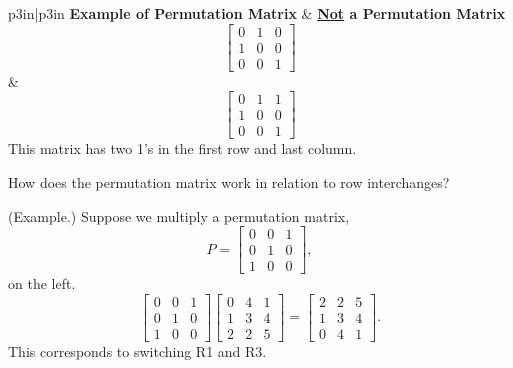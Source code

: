 \documentclass[letterpaper]{article}
\newcommand{\0}{\mathbf{0}}
\begin{document}
\begin{center}
    \begin{tabular}{p{3in}|p{3in}}
        \textbf{Example of Permutation Matrix} & \textbf{\underline{Not} a Permutation Matrix} \\ 
        \hline 
        \[\begin{bmatrix}
            0 & 1 & 0 \\ 
            1 & 0 & 0 \\ 
            0 & 0 & 1 
        \end{bmatrix}\] & \[\begin{bmatrix}
            0 & 1 & 1 \\ 
            1 & 0 & 0 \\ 
            0 & 0 & 1
        \end{bmatrix}\]
        This matrix has two 1's in the first row and last column.
    \end{tabular}
\end{center}
How does the permutation matrix work in relation to row interchanges?

\begin{mdframed}
    (Example.) Suppose we multiply a permutation matrix, 
    \[P = \begin{bmatrix}
        0 & 0 & 1 \\ 
        0 & 1 & 0 \\ 
        1 & 0 & 0
    \end{bmatrix},\]
    on the left. 
    \[\begin{bmatrix}
        0 & 0 & 1 \\ 
        0 & 1 & 0 \\ 
        1 & 0 & 0
    \end{bmatrix} \begin{bmatrix}
        0 & 4 & 1 \\ 
        1 & 3 & 4 \\ 
        2 & 2 & 5
    \end{bmatrix} = \begin{bmatrix}
        2 & 2 & 5 \\ 
        1 & 3 & 4 \\ 
        0 & 4 & 1
    \end{bmatrix}.\]
    This corresponds to switching R1 and R3. 
\end{mdframed}
\end{document}
